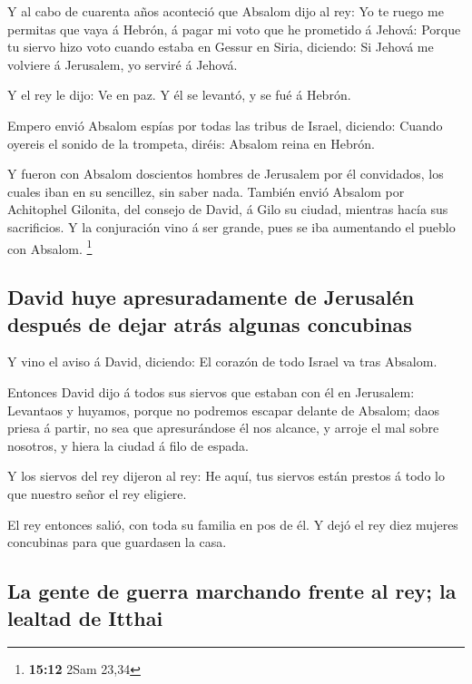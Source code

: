  Y al cabo de cuarenta años aconteció que Absalom dijo al
rey: Yo te ruego me permitas que vaya á Hebrón, á pagar mi voto que he
prometido á Jehová:  Porque tu siervo hizo voto cuando
estaba en Gessur en Siria, diciendo: Si Jehová me volviere á Jerusalem,
yo serviré á Jehová.

 Y el rey le dijo: Ve en paz. Y él se levantó, y se fué á
Hebrón.

 Empero envió Absalom espías por todas las tribus de
Israel, diciendo: Cuando oyereis el sonido de la trompeta, diréis:
Absalom reina en Hebrón.

 Y fueron con Absalom doscientos hombres de Jerusalem por
él convidados, los cuales iban en su sencillez, sin saber nada.
 También envió Absalom por Achitophel Gilonita, del
consejo de David, á Gilo su ciudad, mientras hacía sus sacrificios. Y la
conjuración vino á ser grande, pues se iba aumentando el pueblo con
Absalom. \footnote{\textbf{15:12} 2Sam 23,34}

\hypertarget{david-huye-apresuradamente-de-jerusaluxe9n-despuuxe9s-de-dejar-atruxe1s-algunas-concubinas}{%
\subsection{David huye apresuradamente de Jerusalén después de dejar
atrás algunas
concubinas}\label{david-huye-apresuradamente-de-jerusaluxe9n-despuuxe9s-de-dejar-atruxe1s-algunas-concubinas}}

 Y vino el aviso á David, diciendo: El corazón de todo
Israel va tras Absalom.

 Entonces David dijo á todos sus siervos que estaban con
él en Jerusalem: Levantaos y huyamos, porque no podremos escapar delante
de Absalom; daos priesa á partir, no sea que apresurándose él nos
alcance, y arroje el mal sobre nosotros, y hiera la ciudad á filo de
espada.

 Y los siervos del rey dijeron al rey: He aquí, tus
siervos están prestos á todo lo que nuestro señor el rey eligiere.

 El rey entonces salió, con toda su familia en pos de él.
Y dejó el rey diez mujeres concubinas para que guardasen la casa.

\hypertarget{la-gente-de-guerra-marchando-frente-al-rey-la-lealtad-de-itthai}{%
\subsection{La gente de guerra marchando frente al rey; la lealtad de
Itthai}\label{la-gente-de-guerra-marchando-frente-al-rey-la-lealtad-de-itthai}}

